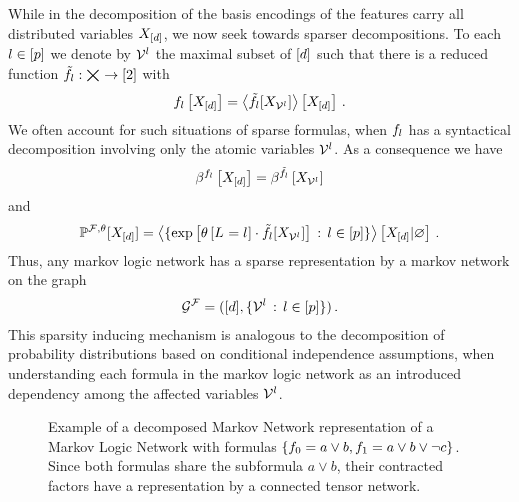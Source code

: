 While in the decomposition of  the basis encodings of the features carry all distributed variables $X_{[d]}$, we now seek towards sparser decompositions.
To each $l\in[p]$ we denote by $\mathcal{V}^{l}$ the maximal subset of $[d]$ such that there is a reduced function
$\tilde{f}_{l} : \bigtimes_{} \rightarrow [2]$
with
\begin{align*}
    f_{l}\left[X_{[d]}\right]
    = \left\langle \tilde{f}_{l}[X_{\mathcal{V}^{l}}]\right\rangle \left[ X_{[d]} \right] \, .
\end{align*}
We often account for such situations of sparse formulas, when $f_{l}$ has a syntactical decomposition involving only the atomic variables $\mathcal{V}^{l}$.
As a consequence we have
\begin{align*}
    \beta^{f_{l}}\left[X_{[d]}\right]
    = \beta^{\tilde{f}_{l}}\left[X_{\mathcal{V}^{l}}\right]
\end{align*}
and
\begin{align*}
    \mathbb{P}^{\mathcal{F},\theta}[X_{[d]}]
    = \left\langle \{\mathrm{exp}\left[\theta\left[L_{}=l_{}\right]\cdot\tilde{f}_{l}[X_{\mathcal{V}^{l}}]\right] \, : \, l\in[p]\}\right\rangle \left[ X_{[d]} | \varnothing \right] \, .
\end{align*}
Thus, any markov logic network has a sparse representation by a markov network on the graph
\begin{align*}
    \mathcal{G}^{\mathcal{F}} = ([d],\{\mathcal{V}^{l} \, : \, l\in[p]\}) \, .
\end{align*}
This sparsity inducing mechanism is analogous to the decomposition of probability distributions based on conditional independence assumptions, when understanding each formula in the markov logic network as an introduced dependency among the affected variables $\mathcal{V}^{l}$.


\begin{figure}[t]
    \begin{center}
        
    \end{center}
    \caption{Example of a decomposed Markov Network representation of a Markov Logic Network with formulas $\{f_{0} = a\lor b, f_{1} = a \lor b \lor \lnot c\}$.
    Since both formulas share the subformula $a\lor b$, their contracted factors have a representation by a connected tensor network.}
    \label{fig:mlnDecRep}
\end{figure}


